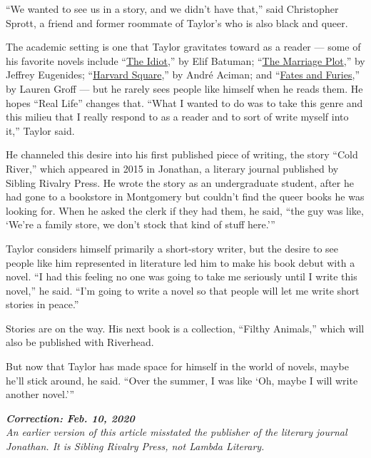 ``We wanted to see us in a story, and we didn't have that,'' said
Christopher Sprott, a friend and former roommate of Taylor's who is also
black and queer.

The academic setting is one that Taylor gravitates toward as a reader
--- some of his favorite novels include
``\href{https://www.nytimes.com/2017/02/28/books/review-elif-batuman-idiot.html}{The
Idiot},'' by Elif Batuman;
``\href{https://www.nytimes.com/2011/10/16/books/review/the-marriage-plot-by-jeffrey-eugenides-book-review.html}{The
Marriage Plot},'' by Jeffrey Eugenides;
``\href{https://www.nytimes.com/2013/04/11/books/harvard-square-by-andre-aciman.html}{Harvard
Square},'' by André Aciman; and
``\href{https://www.nytimes.com/2015/09/13/books/review/lauren-groffs-fates-and-furies.html}{Fates
and Furies},'' by Lauren Groff --- but he rarely sees people like
himself when he reads them. He hopes ``Real Life'' changes that. ``What
I wanted to do was to take this genre and this milieu that I really
respond to as a reader and to sort of write myself into it,'' Taylor
said.

He channeled this desire into his first published piece of writing, the
story ``Cold River,'' which appeared in 2015 in Jonathan, a literary
journal published by Sibling Rivalry Press. He wrote the story as an
undergraduate student, after he had gone to a bookstore in Montgomery
but couldn't find the queer books he was looking for. When he asked the
clerk if they had them, he said, ``the guy was like, `We're a family
store, we don't stock that kind of stuff here.'''

Taylor considers himself primarily a short-story writer, but the desire
to see people like him represented in literature led him to make his
book debut with a novel. ``I had this feeling no one was going to take
me seriously until I write this novel,'' he said. ``I'm going to write a
novel so that people will let me write short stories in peace.''

Stories are on the way. His next book is a collection, ``Filthy
Animals,'' which will also be published with Riverhead.

But now that Taylor has made space for himself in the world of novels,
maybe he'll stick around, he said. ``Over the summer, I was like `Oh,
maybe I will write another novel.'''

\emph{\textbf{Correction: Feb. 10, 2020}}\\
\emph{An earlier version of this article misstated the publisher of the
literary journal Jonathan. It is Sibling Rivalry Press, not Lambda
Literary.}

